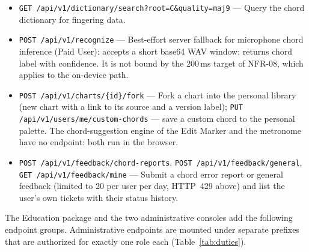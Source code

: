 \documentclass[a4paper]{article}
\begin{document}
\begin{itemize}
    \item \texttt{GET /api/v1/dictionary/search?root=C\&quality=maj9} --- Query the chord dictionary for fingering data.
    \item \texttt{POST /api/v1/recognize} --- Best-effort server fallback for microphone chord inference (Paid User): accepts a short base64 WAV window; returns chord label with confidence. It is not bound by the 200\,ms target of NFR-08, which applies to the on-device path.
    \item \texttt{POST /api/v1/charts/\{id\}/fork} --- Fork a chart into the personal library (new chart with a link to its source and a version label); \texttt{PUT /api/v1/users/me/custom-chords} --- save a custom chord to the personal palette. The chord-suggestion engine of the Edit Marker and the metronome have no endpoint: both run in the browser.
    \item \texttt{POST /api/v1/feedback/chord-reports}, \texttt{POST /api/v1/feedback/general}, \texttt{GET /api/v1/feedback/mine} --- Submit a chord error report or general feedback (limited to 20 per user per day, HTTP~429 above) and list the user's own tickets with their status history.
\end{itemize}

The Education package and the two administrative consoles add the following endpoint groups. Administrative endpoints are mounted under separate prefixes that are authorized for exactly one role each (Table~\ref{tab:duties}).
\end{document}
